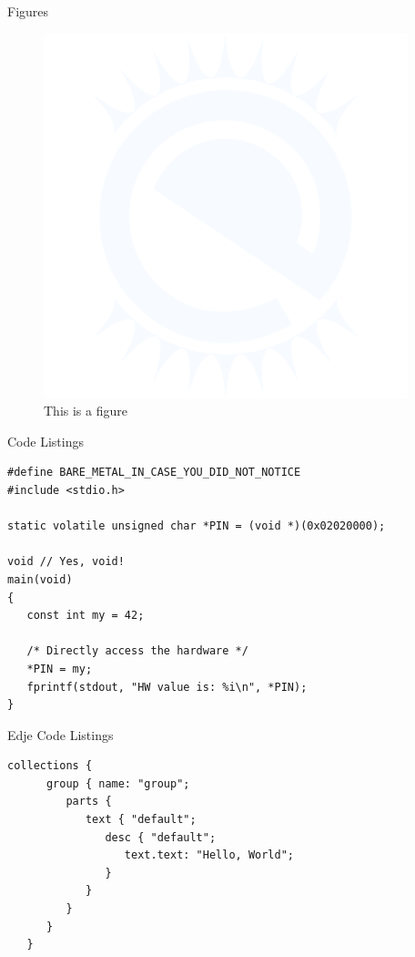 \documentclass[aspectratio=169]{beamer}
\begin{document}
\begin{frame}{Figures}
   \begin{figure}[h!]\centering
      \includegraphics[scale=0.5]{img/theme/e_logo}
      \caption{This is a figure}
   \end{figure}
\end{frame}

\begin{frame}[fragile]{Code Listings}
   \begin{lstlisting}
#define BARE_METAL_IN_CASE_YOU_DID_NOT_NOTICE
#include <stdio.h>

static volatile unsigned char *PIN = (void *)(0x02020000);

void // Yes, void!
main(void)
{
   const int my = 42;

   /* Directly access the hardware */
   *PIN = my;
   fprintf(stdout, "HW value is: %i\n", *PIN);
}
   \end{lstlisting}
\end{frame}


\begin{frame}[fragile]{Edje Code Listings}
   \begin{lstlisting}[language=edje]
   collections {
      group { name: "group";
         parts {
            text { "default";
               desc { "default";
                  text.text: "Hello, World";
               }
            }
         }
      }
   }
   \end{lstlisting}
\end{frame}
\end{document}
